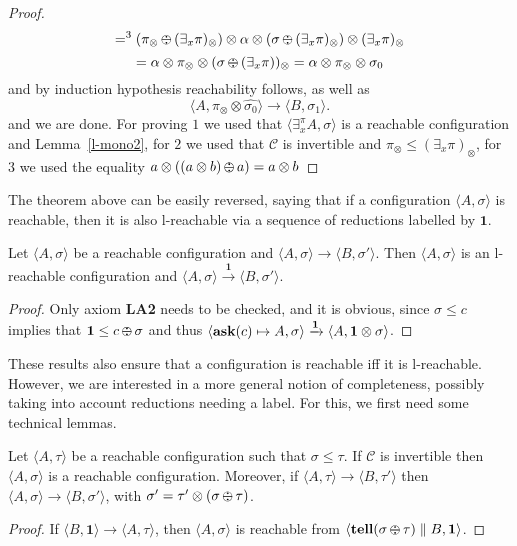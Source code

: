 \documentclass{llncs}
\def\1{{\mathbf 1}}
\def\C{{\mathcal C}}
\newcommand{\tell}{{\bf tell}}
\newcommand{\ask}{{\bf ask}}
\def\monid{{\mathbf 0}}
\def\1{{\mathbf 1}}
\def\C{{\mathcal C}}
\def\odiv{\, {\ominus\hspace{-7.7pt} \div} \,}
\def\monid{\mathbf{1}}
\begin{document}
\begin{proof}
{$$ =^3 (\pi_\otimes \odiv (\exists_x \pi)_\otimes) \otimes \alpha \otimes (\sigma \odiv (\exists_x \pi)_\otimes) \otimes (\exists_x \pi)_\otimes$$
$$= \alpha \otimes \pi_\otimes \otimes  (\sigma \odiv (\exists_x \pi))_\otimes 
= \alpha \otimes \pi_\otimes \otimes  \sigma_0
$$
and by induction hypothesis reachability follows, as well as 
$$\langle A, \pi_\otimes \otimes \widehat{\sigma_0} \rangle \to \langle B, \sigma_1 \rangle.$$
and we are done. For proving $1$ we used that $\langle \exists^\pi_x A, \sigma \rangle$ is a reachable configuration
and Lemma~\ref{l-mono2}, for $2$ we used that $\C$ is invertible and $\pi_\otimes \leq (\exists_x \pi)_\otimes$,
for $3$ we used the equality $a \otimes ((a \otimes b) \odiv a) = a \otimes b$}
\end{proof}

The theorem above can be easily reversed, saying that if a configuration $\langle A, \sigma \rangle$ is reachable,
then it is also l-reachable via a sequence of reductions labelled by $\monid$.

\begin{lemma}
Let $\langle A, \sigma \rangle$ be a reachable configuration and
$\langle A, \sigma \rangle \to \langle B, \sigma' \rangle$. 
Then $\langle A, \sigma \rangle$ is an l-reachable configuration and
$\langle A, \sigma \rangle \xrightarrow{\monid}  \langle B, \sigma' \rangle$.
\end{lemma}
\begin{proof}
Only axiom  {\bf LA2} needs to be checked, and it is obvious, since $\sigma \leq c$ implies that 
$\monid \leq c \odiv \sigma$ and thus 
$\langle \hbox{\ask}(c) \mapsto A, \sigma \rangle \xrightarrow{\monid}
  	\langle A, \monid \otimes \sigma \rangle$.
\end{proof}	
	
These results also ensure that a configuration is reachable iff it is l-reachable.
%
However, we are interested in a more general notion of completeness, possibly taking into account 
reductions needing a label. For this, we first need some technical lemmas.

\begin{lemma}
\label{minor}
Let $\langle A, \tau \rangle$ be a reachable configuration such that
$\sigma \leq \tau$. If $\C$ is invertible then $\langle A, \sigma \rangle$ is a reachable configuration.
%
Moreover, if  $\langle A, \tau \rangle \to \langle B, \tau' \rangle$ then
$\langle A, \sigma \rangle \to \langle B, \sigma' \rangle$, 
with $\sigma' = \tau' \otimes (\sigma \odiv \tau)$.
\end{lemma}
\begin{proof}
If
$\langle B, \1 \rangle \to \langle A, \tau \rangle$,
then $\langle A, \sigma \rangle$ is reachable from
 $\langle \hbox{\tell}(\sigma \odiv \tau) \parallel B, \1 \rangle$.
\end{proof}
\end{document}

